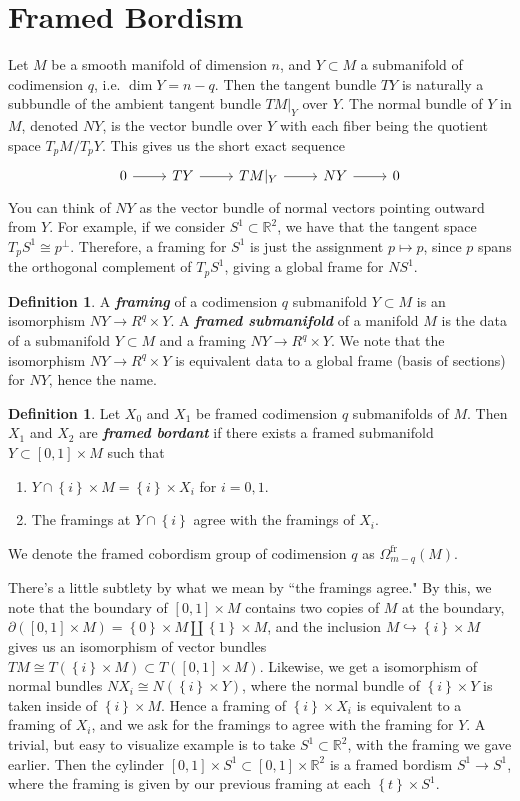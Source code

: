 \documentclass[psamsfonts]{amsart}
\theoremstyle{definition}
\newtheorem{defn}[thm]{Definition}
\theoremstyle{remark}
\newcommand{\R}{\mathbb{R}}
\newcommand{\ib}[1]{\textbf{\textit{#1}}}
\newcommand{\set}[1]{\left\lbrace #1 \right\rbrace}
\newcommand{\bd}{\partial}
\begin{document}
\section*{Framed Bordism}
%
Let $M$ be a smooth manifold of dimension $n$, and $Y \subset M$ a submanifold of codimension $q$, i.e. $\dim Y = n - q$. Then the tangent bundle $TY$ is naturally a subbundle of the ambient tangent bundle $TM\vert_Y$ over $Y$. The normal bundle of $Y$ in $M$, denoted $NY$, is the vector bundle over $Y$ with each fiber being the quotient space $T_pM / T_pY$. This gives us the short exact sequence
$$\begin{tikzcd}
0 \ar[r] & TY \ar[r] & TM\vert_Y \ar[r] & NY \ar[r] & 0
\end{tikzcd}$$
You can think of $NY$ as the vector bundle of normal vectors pointing outward from $Y$. For example, if we consider $S^1 \subset \R^2$, we have that the tangent space $T_pS^1 \cong p^\perp$. Therefore, a framing for $S^1$ is just the assignment $p \mapsto p$, since $p$ spans the orthogonal complement of $T_pS^1$, giving a global frame for $NS^1$.
%
\begin{defn}
A \ib{framing} of a codimension $q$ submanifold $Y \subset M$ is an isomorphism $NY \to R^q \times Y$. A \ib{framed submanifold} of a manifold $M$ is the data of a submanifold $Y \subset M$ and a framing $NY \to R^q \times Y$. We note that the isomorphism $NY \to R^q \times Y$ is equivalent data to a global frame (basis of sections) for $NY$, hence the name.
\end{defn}
%
\begin{defn}
Let $X_0$ and $X_1$ be framed codimension $q$ submanifolds of $M$. Then $X_1$ and $X_2$ are \ib{framed bordant} if there exists a framed submanifold $Y \subset [0,1] \times M$ such that
\begin{enumerate}
\item $Y \cap \set{i} \times M = \set{i} \times X_i$ for $i = 0,1$.
\item The framings at $Y \cap \set{i}$ agree with the framings of $X_i$.
\end{enumerate}
We denote the framed cobordism group of codimension $q$ as $\Omega^{\text{fr}}_{m-q}(M)$. 
\end{defn}
There's a little subtlety by what we mean by ``the framings agree." By this, we note that the boundary of $[0,1] \times M$ contains two copies of $M$ at the boundary, $\bd([0,1] \times M) = \set{0} \times M \coprod \set{1} \times M$, and the inclusion $M \hookrightarrow \set{i} \times M$ gives us an isomorphism of vector bundles $TM \cong T(\set{i} \times M) \subset T([0,1] \times M)$. Likewise, we get a isomorphism of normal bundles $NX_i \cong N(\set{i} \times Y)$, where the normal bundle of $\set{i} \times Y$ is taken inside of $\set{i} \times M$. Hence a framing of $\set{i} \times X_i$ is equivalent to a framing of $X_i$, and we ask for the framings to agree with the framing for $Y$. A trivial, but easy to visualize example is to take $S^1 \subset \R^2$, with the framing we gave earlier. Then the cylinder $[0,1] \times S^1 \subset [0,1] \times \R^2$ is a framed bordism $S^1 \to S^1$, where the framing is given by our previous framing at each $\set{t} \times S^1$.
\end{document}
